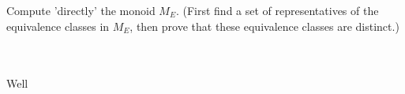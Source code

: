 Compute 'directly' the monoid $M_E$. (First find a set of representatives of the equivalence classes in
$M_E$, then prove that these equivalence classes are distinct.)\\\\

\begin{solution}\renewcommand{\qedsymbol}{}\ \\
    Well
\end{solution}